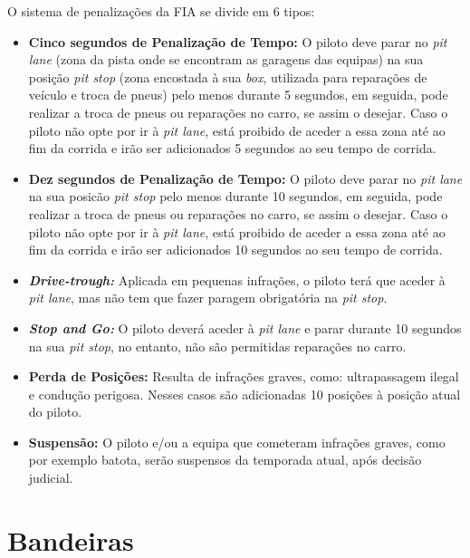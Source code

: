 \documentclass{report}
\begin{document}
O sistema de penalizações da FIA se divide em 6 tipos:
\begin{itemize}
    \item \textbf{Cinco segundos de Penalização de Tempo:} O piloto deve parar no \textit{pit lane} (zona da pista onde se encontram as garagens das equipas) na sua posição \textit{pit stop} (zona encostada à sua \textit{box}, utilizada para reparações de veículo e troca de pneus) pelo menos durante 5 segundos, em seguida, pode realizar a troca de pneus ou reparações no carro, se assim o desejar. Caso o piloto não opte por ir à \textit{pit lane}, está proibido de aceder a essa zona até ao fim da corrida e irão ser adicionados 5 segundos ao seu tempo de corrida.
    \item \textbf{Dez segundos de Penalização de Tempo:} O piloto deve parar no \textit{pit lane} na sua posicão \textit{pit stop} pelo menos durante 10 segundos, em seguida, pode realizar a troca de pneus ou reparações no carro, se assim o desejar. Caso o piloto não opte por ir à \textit{pit lane}, está proibido de aceder a essa zona até ao fim da corrida e irão ser adicionados 10 segundos ao seu tempo de corrida.
    \item \textbf{\textit{Drive-trough:}} Aplicada em pequenas infrações, o piloto terá que aceder à \textit{pit lane}, mas não tem que fazer paragem obrigatória na \textit{pit stop}.
    \item \textbf{\textit{Stop and Go:}} O piloto deverá aceder à \textit{pit lane} e parar durante 10 segundos na sua \textit{pit stop}, no entanto, não são permitidas reparações no carro.
    \item \textbf{Perda de Posições:} Resulta de infrações graves, como: ultrapassagem ilegal e condução perigosa. Nesses casos são adicionadas 10 posições à posição atual do piloto.
    \item \textbf{Suspensão:} O piloto e/ou a equipa que cometeram infrações graves, como por exemplo batota, serão suspensos da temporada atual, após decisão judicial.
\end{itemize}
\section{Bandeiras}
\end{document}
